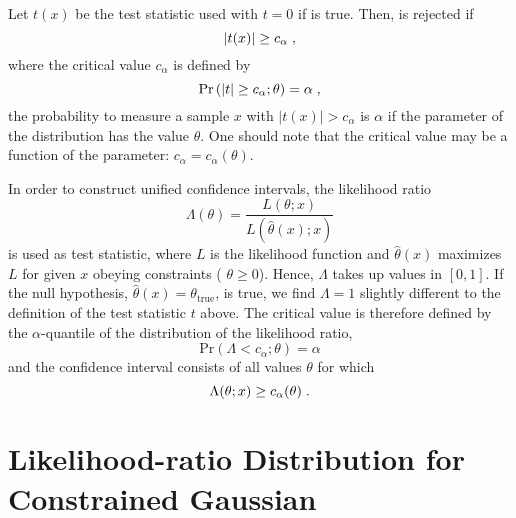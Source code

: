 \documentclass[a4paper]{article}
\newcommand*\Hz{\maybebm{\mathrm{H}_0}\xspace}
\newcommand*\Prob{\mathrm{Pr}}
\begin{document}
Let $t(x)$ be the test statistic used with $t=0$ if \Hz is true. Then,
\Hz is rejected if
%
\begin{equation*}
  |t(x)| \geq c_\alpha
  \;,
\end{equation*}
%
where the critical value $c_\alpha$ is defined by
%
\begin{equation*}
  \Prob\left( |t| \geq c_\alpha; \theta\right) = \alpha
  \fcomma
\end{equation*}
%
\ie the probability to measure a sample $x$ with $|t(x)| > c_\alpha$ is
$\alpha$ if the parameter of the distribution has the value $\theta$.
One should note that the critical value may be a function of the
parameter: $c_\alpha=c_\alpha(\theta)$.

In order to construct unified confidence intervals, the likelihood ratio
%
\begin{equation*}
  \Lambda(\theta) = \frac{L(\theta; x)}{L(\hat{\theta}(x); x)}
\end{equation*}
%
is used as test statistic, where $L$ is the likelihood function and
$\hat{\theta}(x)$ maximizes $L$ for given $x$ obeying constraints (\eg
$\theta \geq 0$).
Hence, $\Lambda$ takes up values in
$[0,1]$. If the null hypothesis,
$\hat{\theta}(x) = \theta_\mathrm{true}$, is true, we find $\Lambda=1$
slightly different to the definition of the test statistic $t$ above.
The critical value is therefore defined by the $\alpha$-quantile of the
distribution of the likelihood ratio,
%
\begin{equation}
  \label{eq:likelihood:ratio:critical:value}
  \Prob(\Lambda < c_\alpha; \theta) = \alpha
\end{equation}
%
and the confidence interval consists of all values $\theta$ for which
%
\begin{equation*}
  \Lambda(\theta; x) \geq c_\alpha(\theta)
  \;.
\end{equation*}
%

\section{Likelihood-ratio Distribution for Constrained Gaussian}
\end{document}
